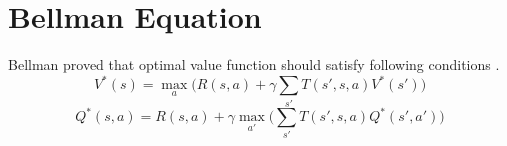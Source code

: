 \section{Bellman Equation}
Bellman proved that optimal value function should satisfy following conditions \cite{bellman_dynamic_2003}. \\
\begin{equation}
\label{eqn:bellman_v}
V^{*}(s) = \max_{a} \big( R(s,a) + \gamma \sum_{s'} T(s',s,a) V^{*}(s') \big)
\end{equation}
\begin{equation}
\label{eqn:bellman_q}
Q^{*}(s,a) = R(s,a) + \gamma \max_{a'} \big( \sum_{s'} T(s',s,a) Q^{*}(s',a') \big)
\end{equation}